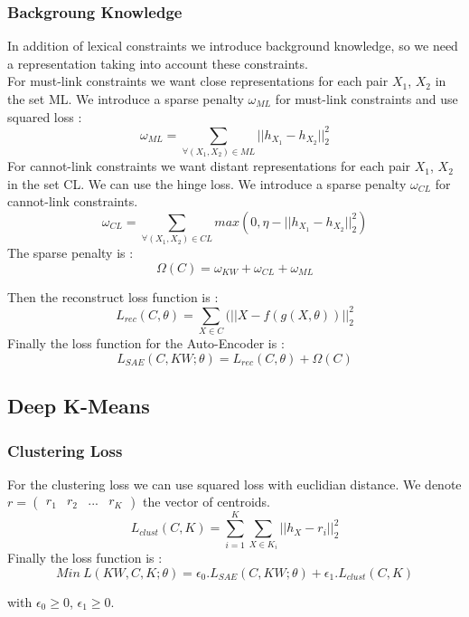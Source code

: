 \subsubsection{Backgroung Knowledge}
In addition of lexical constraints we introduce background knowledge, so we need
a representation taking into account these constraints.\\
For must-link constraints we want close representations for each pair $X_1$, $X_2$
in the set ML. We introduce a sparse penalty $\omega_{ML}$ for must-link
constraints and use squared loss :
\begin{equation}\label{eq:omegaML}
  \omega_{ML} = \sum_{\forall{(X_1,X_2)\in ML}} || h_{X_1} - h_{X_2} ||_2^2
\end{equation}
For cannot-link constraints we want distant representations for each pair $X_1$, $X_2$
in the set CL.
We can use the hinge loss.
We introduce a sparse penalty $\omega_{CL}$ for cannot-link constraints.
\begin{equation}\label{eq:omegaCL}
  \omega_{CL} = \sum_{\forall{(X_1,X_2)\in CL}} max(0,
  \eta - || h_{X_1} - h_{X_2} ||_2^2)
\end{equation}
The sparse penalty is :
\begin{equation}\label{eq:Sparse}
  \Omega(C) = \omega_{KW} + \omega_{CL} + \omega_{ML}  
\end{equation}

Then the reconstruct loss function is :
\begin{equation}\label{eq:AEDK}
  L_{rec}(C, \theta) = \sum_{X \in C}(||X - f(g(X, \theta))||_2^2
\end{equation}
Finally the loss function for the Auto-Encoder is :
\begin{equation}\label{eq:AE}
  L_{SAE}(C,KW; \theta) = L_{rec}(C, \theta) + \Omega(C)  
\end{equation}

\subsection{Deep K-Means}

\subsubsection{Clustering Loss}

For the clustering loss we can use squared loss with euclidian distance. We
denote $r = \begin{pmatrix} r_1 & r_2 & ... & r_K\end{pmatrix}$ the vector of
centroids.  
\begin{equation}\label{eq:loss_clust}
  L_{clust}(C,K) = \sum_{i=1}^K \sum_{X \in K_i} ||h_X - r_i ||_2^2 
\end{equation}
Finally the loss function is :
\begin{equation}\label{eq:loss_FINALE}
  Min~L(KW, C, K; \theta) = \epsilon_0.L_{SAE}(C, KW; \theta) 
  + \epsilon_1.L_{clust}(C,K)
\end{equation}

with $\epsilon_0 \geq 0$, $\epsilon_1 \geq 0$.
